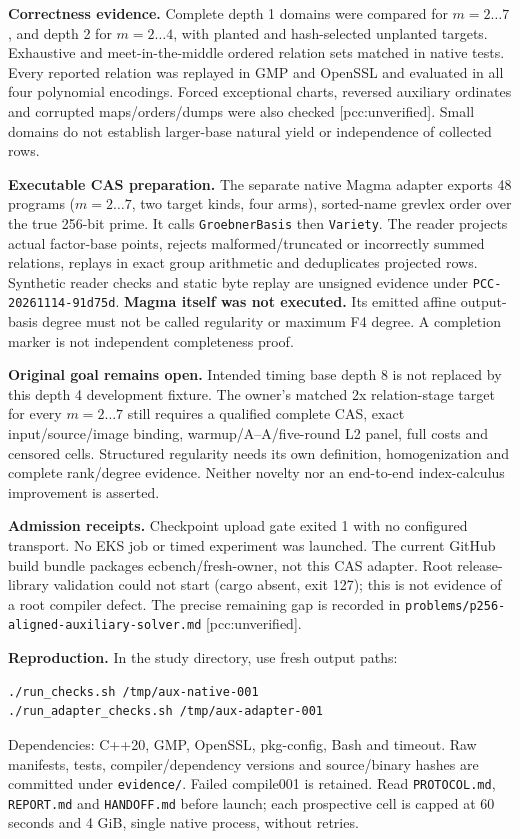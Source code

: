 \documentclass[10pt,a4paper]{article}
\begin{document}
\newpage
\textbf{Correctness evidence.} Complete depth 1 domains were compared for
$m=2\ldots7$, and depth 2 for $m=2\ldots4$, with planted and hash-selected
unplanted targets. Exhaustive and meet-in-the-middle ordered relation sets
matched in native tests. Every reported relation was replayed in GMP and
OpenSSL and evaluated in all four polynomial encodings. Forced exceptional
charts, reversed auxiliary ordinates and corrupted maps/orders/dumps were
also checked [pcc:unverified]. Small domains do not establish larger-base
natural yield or independence of collected rows.

\textbf{Executable CAS preparation.} The separate native Magma adapter
exports 48 programs ($m=2\ldots7$, two target kinds, four arms), sorted-name
grevlex order over the true 256-bit prime. It calls
\texttt{GroebnerBasis} then \texttt{Variety}. The reader projects actual
factor-base points, rejects malformed/truncated or incorrectly summed
relations, replays in exact group arithmetic and deduplicates projected
rows. Synthetic reader checks and static byte replay are unsigned evidence
under \texttt{PCC-20261114-91d75d}. \textbf{Magma itself was not executed.}
Its emitted affine output-basis degree must not be called regularity or
maximum F4 degree. A completion marker is not independent completeness proof.

\textbf{Original goal remains open.} Intended timing base depth 8 is not
replaced by this depth 4 development fixture. The owner's matched 2x
relation-stage target for every $m=2\ldots7$ still requires a qualified
complete CAS, exact input/source/image binding, warmup/A--A/five-round L2
panel, full costs and censored cells. Structured regularity needs its own
definition, homogenization and complete rank/degree evidence. Neither
novelty nor an end-to-end index-calculus improvement is asserted.

\textbf{Admission receipts.} Checkpoint upload gate exited 1 with no
configured transport. No EKS job or timed experiment was launched. The
current GitHub build bundle packages ecbench/fresh-owner, not this CAS
adapter. Root release-library validation could not start (cargo absent,
exit 127); this is not evidence of a root compiler defect. The precise
remaining gap is recorded in
\texttt{problems/p256-aligned-auxiliary-solver.md} [pcc:unverified].

\textbf{Reproduction.} In the study directory, use fresh output paths:
\begin{verbatim}
./run_checks.sh /tmp/aux-native-001
./run_adapter_checks.sh /tmp/aux-adapter-001
\end{verbatim}
Dependencies: C++20, GMP, OpenSSL, pkg-config, Bash and timeout.
Raw manifests, tests, compiler/dependency versions and source/binary hashes
are committed under \texttt{evidence/}. Failed compile001 is retained.
Read \texttt{PROTOCOL.md}, \texttt{REPORT.md} and \texttt{HANDOFF.md}
before launch; each prospective cell is capped at 60 seconds and 4 GiB,
single native process, without retries.
\end{document}
